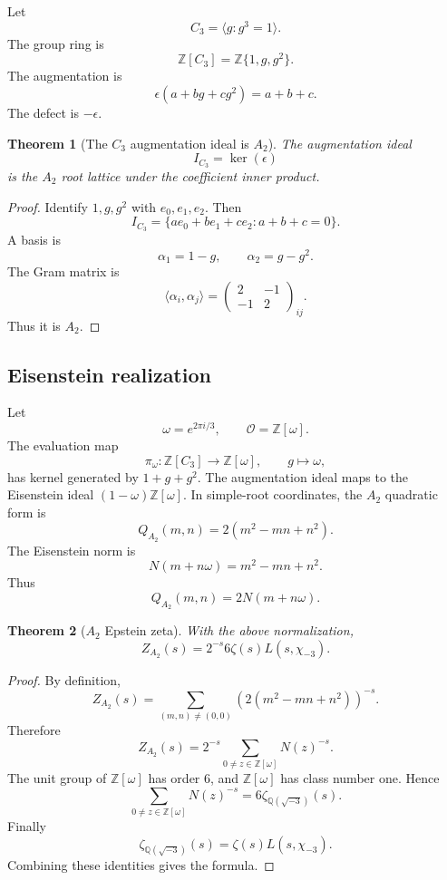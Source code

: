 \documentclass[11pt]{article}
\newtheorem{theorem}{Theorem}[section]
\newcommand{\ZZ}{\mathbb Z}
\newcommand{\QQ}{\mathbb Q}
\newcommand{\OO}{\mathcal O}
\begin{document}
Let
\[
        C_3=\langle g:g^3=1\rangle.
\]
The group ring is
\[
        \ZZ[C_3]=\ZZ\{1,g,g^2\}.
\]
The augmentation is
\[
        \epsilon(a+bg+cg^2)=a+b+c.
\]
The defect is $-\epsilon$.

\begin{theorem}[The $C_3$ augmentation ideal is $A_2$]
The augmentation ideal
\[
        I_{C_3}=\ker(\epsilon)
\]
is the $A_2$ root lattice under the coefficient inner product.
\end{theorem}

\begin{proof}
Identify $1,g,g^2$ with $e_0,e_1,e_2$.  Then
\[
        I_{C_3}=\{a e_0+b e_1+c e_2:a+b+c=0\}.
\]
A basis is
\[
        \alpha_1=1-g,
        \qquad
        \alpha_2=g-g^2.
\]
The Gram matrix is
\[
        \langle\alpha_i,\alpha_j\rangle=
        \begin{pmatrix}
        2&-1\\
        -1&2
        \end{pmatrix}_{ij}.
\]
Thus it is $A_2$.
\end{proof}

\subsection{Eisenstein realization}

Let
\[
        \omega=e^{2\pi i/3},
        \qquad \OO=\ZZ[\omega].
\]
The evaluation map
\[
        \pi_\omega:\ZZ[C_3]\to\ZZ[\omega],
        \qquad g\mapsto\omega,
\]
has kernel generated by $1+g+g^2$.  The augmentation ideal maps to the Eisenstein ideal $(1-\omega)\ZZ[\omega]$.  In simple-root coordinates, the $A_2$ quadratic form is
\[
        Q_{A_2}(m,n)=2(m^2-mn+n^2).
\]
The Eisenstein norm is
\[
        N(m+n\omega)=m^2-mn+n^2.
\]
Thus
\[
        Q_{A_2}(m,n)=2N(m+n\omega).
\]

\begin{theorem}[$A_2$ Epstein zeta]
With the above normalization,
\[
        Z_{A_2}(s)
        =2^{-s}6\zeta(s)L(s,\chi_{-3}).
\]
\end{theorem}

\begin{proof}
By definition,
\[
        Z_{A_2}(s)=\sum_{(m,n)\ne(0,0)}\left(2(m^2-mn+n^2)\right)^{-s}.
\]
Therefore
\[
        Z_{A_2}(s)=2^{-s}\sum_{0\ne z\in\ZZ[\omega]}N(z)^{-s}.
\]
The unit group of $\ZZ[\omega]$ has order $6$, and $\ZZ[\omega]$ has class number one.  Hence
\[
        \sum_{0\ne z\in\ZZ[\omega]}N(z)^{-s}
        =6\zeta_{\QQ(\sqrt{-3})}(s).
\]
Finally
\[
        \zeta_{\QQ(\sqrt{-3})}(s)=\zeta(s)L(s,\chi_{-3}).
\]
Combining these identities gives the formula.
\end{proof}
\end{document}

